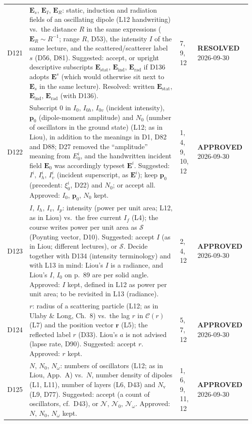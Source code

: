 \documentclass[11pt, oneside]{article}
\newcommand{\approved}{\textbf{APPROVED}}
\newcommand{\resolved}{\textbf{RESOLVED}}
\begin{document}
\begin{longtable}{l >{\raggedright\arraybackslash}p{} l l}
D121 & $\mathbf{E}_s$, $\mathbf{E}_I$, $\mathbf{E}_R$: static, induction and radiation fields of an oscillating dipole (L12 handwriting) vs.\ the distance $R$ in the same expressions ($\mathbf{E}_R \sim R^{-1}$; range $R$, D53), the intensity $I$ of the same lecture, and the scattered/scatterer label $s$ (D56, D81). Suggested: accept, or upright descriptive subscripts $\mathbf{E}_\mathrm{stat}$, $\mathbf{E}_\mathrm{ind}$, $\mathbf{E}_\mathrm{rad}$ if D136 adopts $\mathbf{E}^s$ (which would otherwise sit next to $\mathbf{E}_s$ in the same lecture). Resolved: written $\mathbf{E}_\mathrm{stat}$, $\mathbf{E}_\mathrm{ind}$, $\mathbf{E}_\mathrm{rad}$ (with D136). & 7, 9, 12 & \resolved{} 2026-09-30 \\
D122 & Subscript 0 in $I_0$, $I_{0h}$, $I_{0v}$ (incident intensity), $\mathbf{p}_0$ (dipole-moment amplitude) and $N_0$ (number of oscillators in the ground state) (L12; as in Liou), in addition to the meanings in D1, D82 and D88; D27 removed the ``amplitude'' meaning from $E_0^i$, and the handwritten incident field $\mathbf{E}_0$ was accordingly typeset $\mathbf{E}^i$. Suggested: $I^i$, $I^i_h$, $I^i_v$ (incident superscript, as $\mathbf{E}^i$); keep $\mathbf{p}_0$ (precedent: $\xi_0^i$, D22) and $N_0$; or accept all. Approved: $I_0$, $\mathbf{p}_0$, $N_0$ kept. & 1, 4, 9, 10, 12 & \approved{} 2026-09-30 \\
D123 & $I$, $I_h$, $I_v$, $I_p$: intensity (power per unit area; L12, as in Liou) vs.\ the free current $I_f$ (L4); the course writes power per unit area as $\mathcal{S}$ (Poynting vector, D10). Suggested: accept $I$ (as in Liou; different lectures), or $\mathcal{S}$. Decide together with D134 (intensity terminology) and with L13 in mind: Liou's $I$ is a radiance, and Liou's $I$, $I_0$ on p.~89 are per solid angle. Approved: $I$ kept, defined in L12 as power per unit area; to be revisited in L13 (radiance). & 2, 4, 12 & \approved{} 2026-09-30 \\
D124 & $r$: radius of a scattering particle (L12; as in Ulaby \& Long, Ch.~8) vs.\ the lag $r$ in $\mathcal{C}(r)$ (L7) and the position vector $\mathbf{r}$ (L5); the reflected label $r$ (D33). Liou's $a$ is not advised (lapse rate, D90). Suggested: accept $r$. Approved: $r$ kept. & 5, 7, 12 & \approved{} 2026-09-30 \\
D125 & $N$, $N_0$, $N_\omega$: numbers of oscillators (L12; as in Liou, App.~A) vs.\ $N$, number density of dipoles (L1, L11), number of layers (L6, D43) and $N_\mathrm{v}$ (L9, D77). Suggested: accept (a count of oscillators, cf.\ D43), or $\mathcal{N}$, $\mathcal{N}_0$, $\mathcal{N}_\omega$. Approved: $N$, $N_0$, $N_\omega$ kept. & 1, 6, 9, 11, 12 & \approved{} 2026-09-30 \\

\end{longtable}
\end{document}
